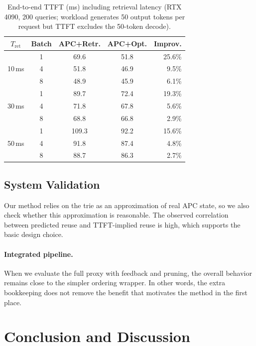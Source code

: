 \documentclass{article}
\begin{document}
\begin{table}[t]
\caption{End-to-end TTFT (ms) including retrieval latency (RTX 4090, 200 queries; workload generates 50 output tokens per request but TTFT excludes the 50-token decode).}
\label{tab:e2e}
\centering
\small
\begin{tabular}{@{}ccccr@{}}
\toprule
$T_{\text{ret}}$ & \textbf{Batch} & \textbf{APC+Retr.} & \textbf{APC+Opt.} & \textbf{Improv.} \\
\midrule
\multirow{3}{*}{10\,ms} & 1 & 69.6 & 51.8 & 25.6\% \\
 & 4 & 51.8 & 46.9 & 9.5\% \\
 & 8 & 48.9 & 45.9 & 6.1\% \\
\midrule
\multirow{3}{*}{30\,ms} & 1 & 89.7 & 72.4 & 19.3\% \\
 & 4 & 71.8 & 67.8 & 5.6\% \\
 & 8 & 68.8 & 66.8 & 2.9\% \\
\midrule
\multirow{3}{*}{50\,ms} & 1 & 109.3 & 92.2 & 15.6\% \\
 & 4 & 91.8 & 87.4 & 4.8\% \\
 & 8 & 88.7 & 86.3 & 2.7\% \\
\bottomrule
\end{tabular}%
\vspace{-0.5em}
\end{table}


\subsection{System Validation}
\label{sec:trie_valid}

Our method relies on the trie as an approximation of real APC state, so we also check whether this approximation is reasonable. The observed correlation between predicted reuse and TTFT-implied reuse is high, which supports the basic design choice.

\paragraph{Integrated pipeline.}
\label{sec:integrated}

When we evaluate the full proxy with feedback and pruning, the overall behavior remains close to the simpler ordering wrapper. In other words, the extra bookkeeping does not remove the benefit that motivates the method in the first place.



\section{Conclusion and Discussion}
\label{sec:conclusion}
\end{document}
